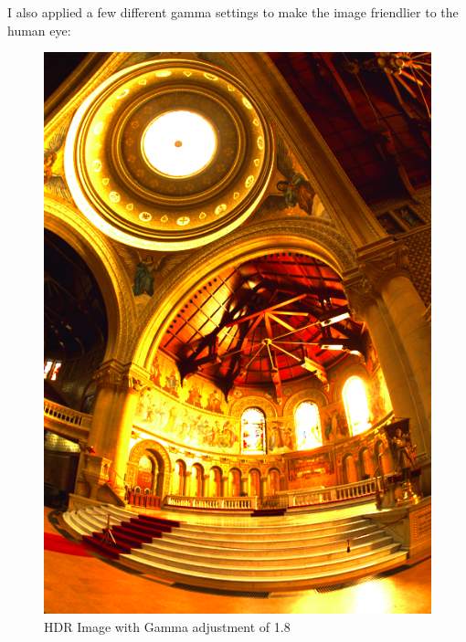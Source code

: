 \documentclass[a4paper,12pt,oneside,final]{report}
\newenvironment{changemargin}[2]{\begin{list}{}{%
\setlength{\topsep}{0pt}%
\setlength{\leftmargin}{0pt}%
\setlength{\rightmargin}{0pt}%
\setlength{\listparindent}{\parindent}%
\setlength{\itemindent}{\parindent}%
\setlength{\parsep}{0pt plus 1pt}%
\addtolength{\leftmargin}{#1}%
\addtolength{\rightmargin}{#2}%
}\item }{\end{list}}
\begin{document}
I also applied a few different gamma settings to make the image friendlier to the human eye:
\begin{figure}[!h]
\begin{changemargin}{-50mm}{-50mm}
\center
\includegraphics[scale=0.35]{memorial_gamma_18.png}
\caption{HDR Image with Gamma adjustment of 1.8}
\end{changemargin}
\end{figure}
\end{document}
